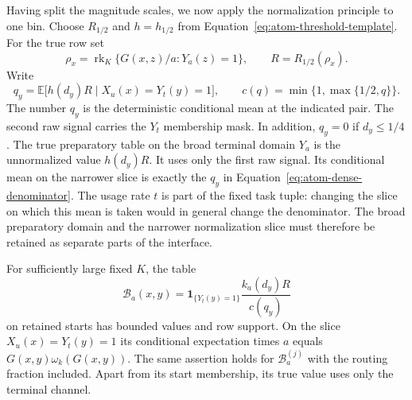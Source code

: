 Having split the magnitude scales, we now apply the normalization principle to one bin. Choose $R_{1/2}$ and $h=h_{1/2}$ from
Equation~\eqref{eq:atom-threshold-template}.  For the true row set
\[
 \rho_x=\operatorname{rk}_K
   \{G(x,z)/a:Y_a(z)=1\},\qquad R=R_{1/2}(\rho_x).
\]
Write
\begin{equation}
 q_y=\mathbb E\bigl[h(d_y)R\mid X_u(x)=Y_t(y)=1\bigr],
 \qquad
 c(q)=\min\{1,\max\{1/2,q\}\}.
 \label{eq:atom-dense-denominator}
\end{equation}
The number $q_y$ is the deterministic conditional mean at the indicated
pair.  The second raw signal carries the $Y_t$ membership mask.  In
addition, $q_y=0$ if $d_y\le1/4$.
The true preparatory table on the broad
terminal domain $Y_a$ is the unnormalized value $h(d_y)R$.  It uses only
the first raw signal.  Its conditional mean on the narrower slice is
exactly the $q_y$ in Equation~\eqref{eq:atom-dense-denominator}.
The usage rate $t$ is part of the fixed task tuple: changing the slice
on which this mean is taken would in general change the denominator.
The broad preparatory domain and the narrower normalization slice must
therefore be retained as separate parts of the interface.

\begin{lemma}
\label{lem:atom-dense}
For sufficiently large fixed $K$, the table
\begin{equation}
 \mathcal B_a(x,y)=
  \mathbf1_{\{Y_t(y)=1\}}\frac{k_a(d_y)R}{c(q_y)}
 \label{eq:atom-dense-table}
\end{equation}
on retained starts has bounded values and row support.  On the slice
$X_u(x)=Y_t(y)=1$ its conditional expectation times $a$ equals
$G(x,y)\omega_k(G(x,y))$.  The same assertion holds for
$\mathcal B_a^{(j)}$ with the routing fraction included.
Apart from its start membership, its true value uses only the terminal
channel.
\end{lemma}

